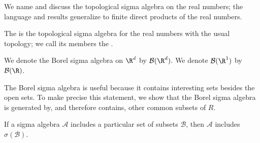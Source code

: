 

We name and discuss
the topological
sigma algebra
on the real numbers;
the language and results
generalize to
finite direct
products of the real numbers.


The 
is the topological sigma algebra
for the real numbers with the usual topology;
we call its members the
.


We denote the Borel sigma algebra on $\R^d$ by $\mathcal{B}(\R^d)$.
We denote $\mathcal{B}(\R^1)$ by $\mathcal{B}(\R)$.


The Borel sigma algebra
is useful because it contains
interesting sets
besides the open sets.
To make precise this statement, we show
that the Borel sigma algebra is generated
by, and therefore contains, other common
subsets of $R$.

\begin{prop}
If a sigma algebra $\mathcal{A}$
includes a particular set of subsets $\mathcal{B}$,
then $\mathcal{A}$ includes $\sigma(\mathcal{B})$.
\end{prop}

